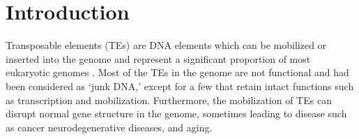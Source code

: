 \documentclass[wsdraft]{ws-procs11x85}
\begin{document}


\bodymatter

\section{Introduction}\label{aba:intro}

Transposable elements (TEs) are DNA elements which can be mobilized or inserted into the genome and represent a significant proportion of most eukaryotic genomes \cite{erwin2014mobile}. 
Most of the TEs in the genome are not functional and had been considered as `junk DNA,' except for a few that retain intact functions such as transcription and mobilization.\cite{biemont2006genetics}
% 
% 
% 
%
Furthermore, the mobilization of TEs can disrupt normal gene structure in the genome, sometimes leading to disease such as cancer \cite{belancio2008mammalian,jirtle2007environmental}
% 
% 
% 
% 
% 
% 
% 
% 
% 
% 
% 
%
neurodegenerative diseases,\cite{erwin2014mobile} and aging.\cite{wood2013chromatin} 
\end{document}
